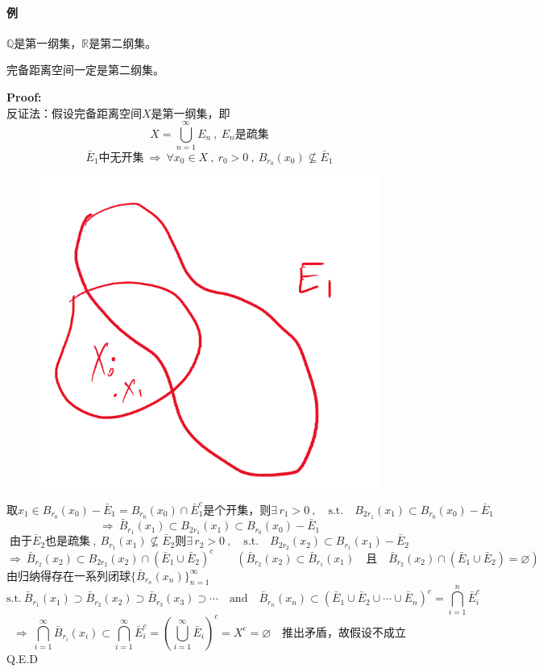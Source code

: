 \paragraph*{例} \quad $\mathbb{Q}$是第一纲集，$\mathbb{R}$是第二纲集。
\begin{theorem}[$Baire$定理] \label{the:Baire}
    完备距离空间一定是第二纲集。
\end{theorem}
\textbf{Proof:}\\
反证法：假设完备距离空间$X$是第一纲集，即
\[X=\bigcup_{n=1}^{\infty}E_n \ , \ E_n\text{是疏集}\]
\[\bar{E}_1\text{中无开集} \ \Rightarrow \ \forall x_0 \in X \ , \ r_0>0 \ , \ B_{r_0}(x_0) \nsubseteq \bar{E}_1\]
\begin{figure}[htbp]
    \center
    \includegraphics[scale=0.4]{./fig/2.1.4_2.png}
\end{figure}
\[\text{取}x_1 \in B_{r_0}(x_0)-\bar{E}_1=B_{r_0}(x_0)\cap\bar{E}_1^c\text{是个开集，则}\exists \, r_1>0 \ , \quad \text{s.t.} \quad B_{2r_1}(x_1) \subset B_{r_0}(x_0)-\bar{E}_1\]
\[\Rightarrow \ \bar{B}_{r_1}(x_1) \subset B_{2r_1}(x_1) \subset B_{r_0}(x_0)-\bar{E}_1\]
\[\text{由于}\bar{E}_2\text{也是疏集} \ , \ B_{r_1}(x_1) \nsubseteq \bar{E}_2\text{则}\exists \, r_2>0 \ , \quad \text{s.t.} \quad B_{2r_2}(x_2) \subset B_{r_1}(x_1)-\bar{E}_2\]
\[\Rightarrow \ \bar{B}_{r_2}(x_2) \subset B_{2r_2}(x_2)\cap(\bar{E}_1\cup\bar{E}_2)^c \qquad (\bar{B}_{r_2}(x_2) \subset \bar{B}_{r_1}(x_1)  \quad \text{且} \quad \bar{B}_{r_2}(x_2)\cap(\bar{E}_1\cup\bar{E}_2)=\varnothing)\]
由归纳得存在一系列闭球$\{\bar{B}_{r_n}(x_n)\}_{n=1}^{\infty}$
\[\text{s.t.} \ \bar{B}_{r_1}(x_1) \supset \bar{B}_{r_2}(x_2) \supset \bar{B}_{r_3}(x_3) \supset \cdots \quad \text{and} \quad \bar{B}_{r_n}(x_n)\subset(\bar{E}_1\cup\bar{E}_2\cup\cdots\cup\bar{E}_n)^c=\bigcap_{i=1}^n\bar{E}_i^c\]
\[\Rightarrow \ \bigcap_{i=1}^{\infty}\bar{B}_{r_i}(x_i) \subset \bigcap_{i=1}^{\infty}\bar{E}_i^c=\left(\bigcup_{i=1}^{\infty}\bar{E}_i\right)^c=X^c=\varnothing \quad \text{推出矛盾，故假设不成立}\]
Q.E.D

